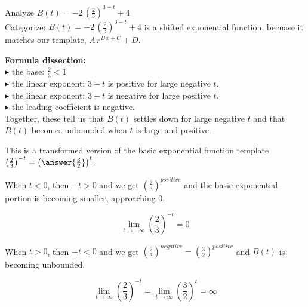 \documentclass{ximera}
\begin{document}
\begin{example}  



Analyze   $B(t) = -2 \, \left( \frac{2}{3} \right)^{3-t} + 4$ \\


Categorize: $B(t) = -2 \, \left( \frac{2}{3} \right)^{3-t} + 4$ is a shifted exponential function, becuase it matches our template,  $A \, r^{B \, x + C} + D$. \\

\begin{idea}


\textbf{\textcolor{purple!85!blue}{Formula dissection:}}  \\


$\blacktriangleright$  the base: $\frac{2}{3} < 1$\\
$\blacktriangleright$  the linear exponent: $3-t$ is positive for large negative $t$. \\
$\blacktriangleright$  the linear exponent: $3-t$ is negative for large positive $t$. \\
$\blacktriangleright$  the leading coefficient is negative. \\


Together, these tell us that $B(t)$ settles down for large negative $t$ and that $B(t)$ becomes unbounded when $t$ is large and positive.



This is a transformed version of the basic exponential function template $\left( \frac{2}{3} \right)^{-t} = \left( \answer{\frac{3}{2}} \right)^t$.  



When $t < 0$, then $-t > 0$ and we get  $\left( \frac{2}{3} \right)^{positive}$ and the basic exponential portion is becoming smaller, approaching $0$.  





\[ \lim\limits_{t \to -\infty} \left( \frac{2}{3} \right)^{-t}  = 0 \]



When $t > 0$, then $-t < 0$ and we get  $\left( \frac{2}{3} \right)^{negative} = \left( \frac{3}{2} \right)^{positive}$ and $B(t)$ is becoming unbounded.  



\[ \lim\limits_{t \to \infty} \left( \frac{2}{3} \right)^{-t}  = \lim\limits_{t \to \infty} \left( \frac{3}{2} \right)^t  = \infty \]





\end{idea}
\end{example}
\end{document}
